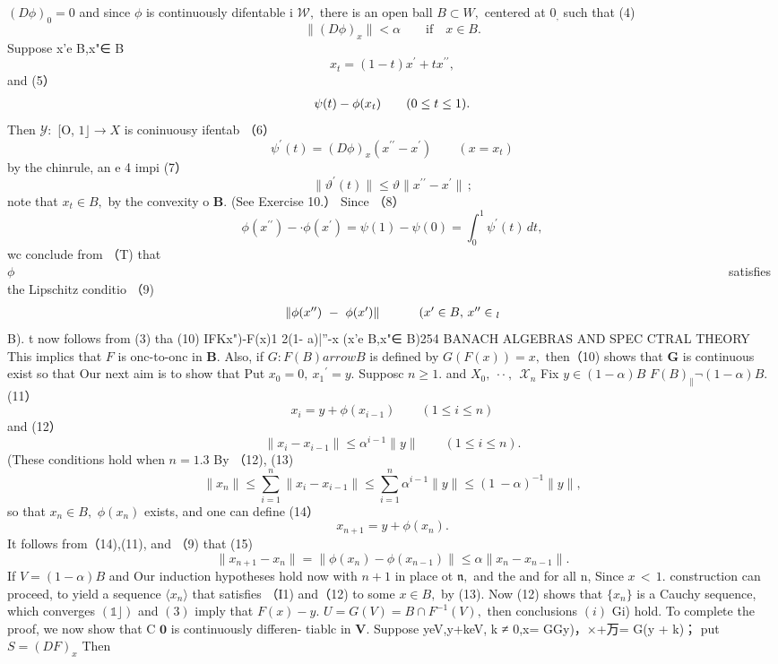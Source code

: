 $(D\phi)_{0}=0$ and since $\phi$ is continuously difentable i ${\mathcal{W}},$ there is an open ball $B\subset W,$ centered at $0_{\mathrm{,}}$ such that (4) $$ \|(D\phi)_{x}\|<\alpha\qquad{\mathrm{if}}\quad x\in B. $$ Suppose x'e B,x"∈ B $$ x_{t}=(1-t)x^{\prime}+t x^{\prime\prime}, $$ and (5） $$ \begin{array}{c c c}{{\psi(t)-\phi(x_{t})}}&{{}}&{{(0\leq t\leq1).}}\end{array} $$ Then ${\mathcal{Y}}\colon$ [O, $1\rfloor\to X$ is coninuousy ifentab （6） $$ \psi^{\prime}(t)=(D\phi)_{x}(x^{\prime\prime}-x^{\prime})\qquad(x=x_{t}) $$ by the chinrule, an e 4 impi (7） $$ \|\vartheta^{\prime}(t)\|\leq\vartheta\|x^{\prime\prime}-x^{\prime}\|\,; $$ note that $x_{t}\in B,$ by the convexity o ${\boldsymbol{B}}.$ (See Exercise 10.） Since （8） $$ \phi(x^{\prime\prime})-\cdot\phi(x^{\prime})=\psi(1)-\psi(0)=\int_{0}^{1}\psi^{\prime}(t)\,d t, $$ wc conclude from （T) that $\phi~~~~~~~~~~~~~~~~~~~~~~~~~~~~~~~~~~~~~~~~~~~~~~~~~~~~~~~~~~~~~~~~~~~~~~~~~~~~~~~~~~~~~~~~~~~~~~~~~~~~~~~~~~~~~~~~~~~~~~~~~~~~~~~~~~~~~~~~~~~~~~~~~~~~~~~~~~~~~~~~~~~~~~~~~~~~~~~~~~~~~~~~~~~~~~~~~~~~~~~~~~~~~~~~~~~~~~~~~~~~~~~~~~~~~~~~~~~~~~~~~~~~~~~~~~~~~~~~$ satisfies the Lipschitz conditio （9) $$ \begin{array}{c c c}{{\|\phi(x^{\prime\prime})\ -\ \phi(x^{\prime})\|\,}}&{{\qquad(x^{\prime}\in B,\,x^{\prime\prime}\in{}_{l}}}\end{array} $$ B). t now follows from (3) tha (10) IFKx")-F(x)1 2(1- a)|”-x (x'e B,x"∈ B)254 BANACH ALGEBRAS AND SPEC CTRAL THEORY This implics that ${\mathbf{}}F$ is onc-to-onc in ${\boldsymbol{B}}.$ Also, if $G\colon F(B) arrow B$ is defined by $G(F(x))=x,$ then（10) shows that ${\boldsymbol{G}}$ is continuous exist so that Our next aim is to show that Put $x_{0}=0,\ x_{1}{}^{\prime}=y.$ Supposc $\scriptstyle n\geq1.$ and $X_{0},\ \cdot\cdot\ ,\ \ {\mathcal{X}}_{n}$ Fix $y\in(1-\alpha)B$ $F(B)_{\parallel}\lnot(1-\alpha)B.$ (11） $$ x_{i}=y+\phi(x_{i-1})\qquad(1\leq i\leq n) $$ and (12） $$ \|x_{i}-x_{i-1}\|\leq\alpha^{i-1}\|y\|\qquad(1\leq i\leq n). $$ (These conditions hold when $n=1.3$ By （12), (13) $$ \|x_{n}\|\leq\sum_{i=1}^{n}\|x_{i}-x_{i-1}\|\leq\sum_{i=1}^{n}\alpha^{i-1}\|y\|\leq(1\ -\alpha)^{-1}\|y\|, $$ so that $x_{n}\in B,$ $\phi(x_{n})$ exists, and one can define (14） $$ x_{n+1}=y+\phi(x_{n}). $$ It follows from（14),(11), and （9) that (15) $$ \|x_{n+1}-x_{n}\|=\|\phi(x_{n})-\phi(x_{n-1})\|\leq\alpha\|x_{n}-x_{n-1}\|. $$ If $V=(1-\alpha)B$ and Our induction hypotheses hold now with $\textstyle n+1$ in place ot ${\mathfrak{n}},$ and the and for all n, Since $\scriptstyle x\,<\,1.$ construction can proceed, to yield a sequence $\langle x_{n}\rangle$ that satisfies （I1) and（12) to some $x\in B,$ by (13). Now (12) shows that $\scriptstyle\{x_{n}\}$ is a Cauchy sequence, which converges $(\mathbb{1}\rfloor)$ and $(3)$ imply that $F(x)-y.$ $U=G(V)=B\cap F^{-1}(V),$ then conclusions $\left(i\right)$ Gi) hold. To complete the proof, we now show that C ${\boldsymbol{0}}$ is continuously differen- tiablc in ${\boldsymbol{V}}.$ Suppose yeV,y+keV, k ≠ 0,x= GGy)，×+万= G(y + k)； put $S=(D F)_{x}$ Then $$ 